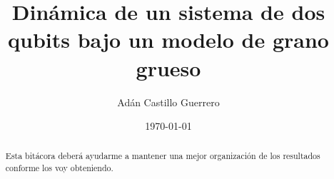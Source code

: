 \documentclass[onecolumn,11pt]{report}
\title{Dinámica de un sistema de dos qubits bajo un modelo de grano grueso}
\author{Adán Castillo Guerrero}
\date{\today}
\begin{document}
\maketitle
\begin{abstract}
    Esta bitácora deberá ayudarme a mantener una mejor organización de los resultados conforme los voy obteniendo. \cite{Chuang}
\end{abstract}
\tableofcontents
\newpage






\end{document}
